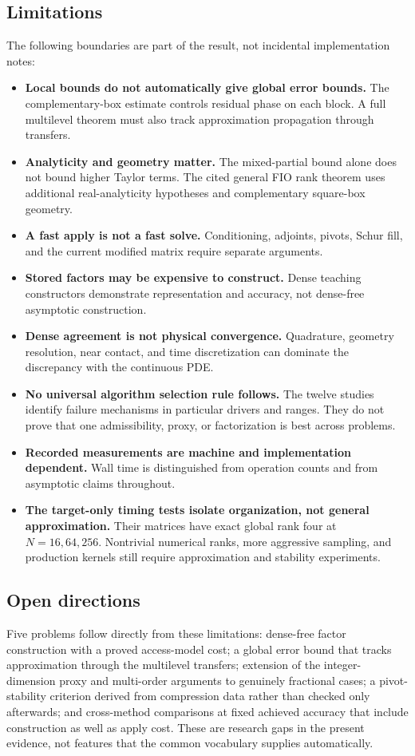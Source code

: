 \documentclass[11pt,a4paper]{article}
\begin{document}
\subsection{Limitations}
The following boundaries are part of the result, not incidental implementation notes:
\begin{itemize}
\item \textbf{Local bounds do not automatically give global error bounds.} The complementary-box estimate controls residual phase on each block. A full multilevel theorem must also track approximation propagation through transfers.
\item \textbf{Analyticity and geometry matter.} The mixed-partial bound alone does not bound higher Taylor terms. The cited general FIO rank theorem uses additional real-analyticity hypotheses and complementary square-box geometry.
\item \textbf{A fast apply is not a fast solve.} Conditioning, adjoints, pivots, Schur fill, and the current modified matrix require separate arguments.
\item \textbf{Stored factors may be expensive to construct.} Dense teaching constructors demonstrate representation and accuracy, not dense-free asymptotic construction.
\item \textbf{Dense agreement is not physical convergence.} Quadrature, geometry resolution, near contact, and time discretization can dominate the discrepancy with the continuous PDE.
\item \textbf{No universal algorithm selection rule follows.} The twelve studies identify failure mechanisms in particular drivers and ranges. They do not prove that one admissibility, proxy, or factorization is best across problems.
\item \textbf{Recorded measurements are machine and implementation dependent.} Wall time is distinguished from operation counts and from asymptotic claims throughout.
\item \textbf{The target-only timing tests isolate organization, not general approximation.} Their matrices have exact global rank four at $N=16,64,256$. Nontrivial numerical ranks, more aggressive sampling, and production kernels still require approximation and stability experiments.
\end{itemize}

\subsection{Open directions}
Five problems follow directly from these limitations: dense-free factor construction with a proved access-model cost; a global error bound that tracks approximation through the multilevel transfers; extension of the integer-dimension proxy and multi-order arguments to genuinely fractional cases; a pivot-stability criterion derived from compression data rather than checked only afterwards; and cross-method comparisons at fixed achieved accuracy that include construction as well as apply cost. These are research gaps in the present evidence, not features that the common vocabulary supplies automatically.
\end{document}
